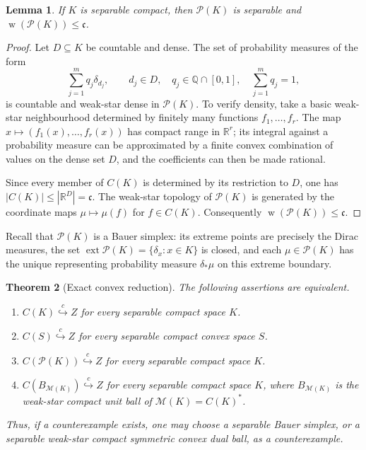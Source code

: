 \documentclass[11pt]{article}
\newtheorem{theorem}{Theorem}[section]
\newtheorem{lemma}[theorem]{Lemma}
\theoremstyle{definition}
\theoremstyle{remark}
\newcommand{\C}{C}
\newcommand{\cc}{\mathfrak c}
\newcommand{\Pp}{\mathcal P}
\newcommand{\M}{\mathcal M}
\newcommand{\w}{\operatorname{w}}
\newcommand{\ext}{\operatorname{ext}}
\newcommand{\hookc}{\stackrel{c}{\hookrightarrow}}
\begin{document}
\begin{lemma}\label{lem:PK-separable}
If $K$ is separable compact, then $\Pp(K)$ is separable and
$\w(\Pp(K))\leq\cc$.
\end{lemma}

\begin{proof}
Let $D\subseteq K$ be countable and dense.  The set of probability measures
of the form
\[
       \sum_{j=1}^m q_j\delta_{d_j},
       \qquad d_j\in D,\quad q_j\in\mathbb Q\cap[0,1],
       \quad \sum_{j=1}^m q_j=1,
\]
is countable and weak-star dense in $\Pp(K)$.  To verify density, take a
basic weak-star neighbourhood determined by finitely many functions
$f_1,\dots,f_r$.  The map
$x\mapsto(f_1(x),\dots,f_r(x))$ has compact range in $\mathbb R^r$; its
integral against a probability measure can be approximated by a finite
convex combination of values on the dense set $D$, and the coefficients can
then be made rational.

Since every member of $\C(K)$ is determined by its restriction to $D$, one
has $|\C(K)|\leq|\mathbb R^D|=\cc$.  The weak-star topology of $\Pp(K)$ is
generated by the coordinate maps $\mu\mapsto\mu(f)$ for $f\in\C(K)$.
Consequently $\w(\Pp(K))\leq\cc$.
\end{proof}

Recall that $\Pp(K)$ is a Bauer simplex: its extreme points are precisely
the Dirac measures, the set
$\ext\Pp(K)=\{\delta_x:x\in K\}$ is closed, and each $\mu\in\Pp(K)$ has the
unique representing probability measure $\delta_*\mu$ on this extreme
boundary.

\begin{theorem}[Exact convex reduction]\label{thm:exact-reduction}
The following assertions are equivalent.
\begin{enumerate}[label=\textup{(\roman*)}]
\item $\C(K)\hookc Z$ for every separable compact space $K$.
\item $\C(S)\hookc Z$ for every separable compact convex space $S$.
\item $\C(\Pp(K))\hookc Z$ for every separable compact space $K$.
\item $\C(B_{\M(K)})\hookc Z$ for every separable compact space $K$, where
      $B_{\M(K)}$ is the weak-star compact unit ball of
      $\M(K)=\C(K)^*$.
\end{enumerate}
Thus, if a counterexample exists, one may choose a separable Bauer simplex,
or a separable weak-star compact symmetric convex dual ball, as a
counterexample.
\end{theorem}
\end{document}
